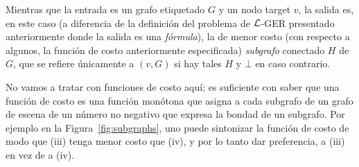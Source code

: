 Mientras que la entrada es un grafo etiquetado $G$ y un nodo target $v$, la
salida es, en este caso (a diferencia de la definici\'on del problema de $\mathcal{L}$-GER 
presentado anteriormente donde la salida es una {\em f\'ormula}), la de menor costo (con
respecto a algunos, la funci\'on de costo anteriormente especificada) 
{\em subgrafo} conectado $H$ de $G$, que se refiere \'unicamente a $(v, G)$ si hay
tales $H$ y $\bot$ en caso contrario.

No vamos a tratar con funciones de costo aqu\'i; es suficiente con saber
que una funci\'on de costo es una funci\'on mon\'otona que asigna a cada
subgrafo de un grafo de escena de un n\'umero no negativo que expresa la
bondad de un subgrafo. Por ejemplo en la Figura~\ref{fig:subgraphs}, uno
puede sintonizar la funci\'on de costo de modo que (iii) tenga menor costo que (iv), y por lo tanto
dar preferencia, a (iii) en vez de a (iv).


